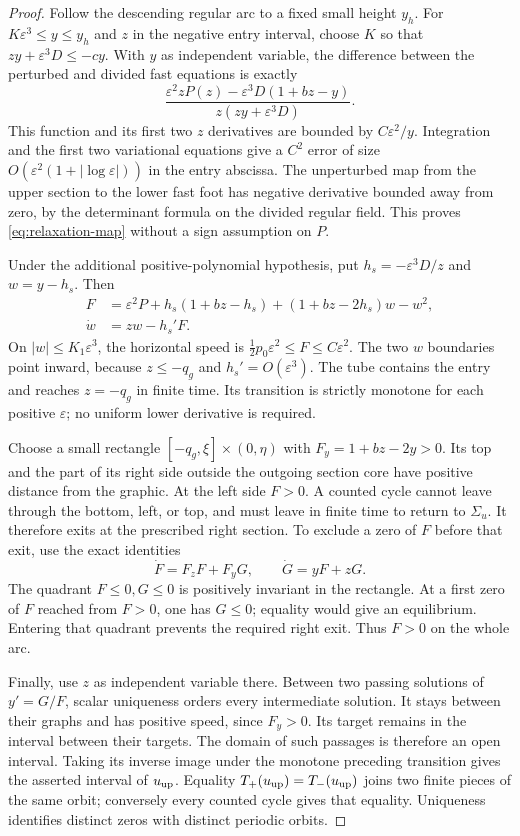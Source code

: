 \begin{proof}
Follow the descending regular arc to a fixed small height $y_h$.
For $K\varepsilon^3\le y\le y_h$ and $z$ in the negative entry
interval, choose $K$ so that $zy+\varepsilon^3D\le-cy$.
With $y$ as independent variable, the difference between the perturbed
and divided fast equations is exactly
\begin{equation}\label{eq:relaxation-error}
 \frac{\varepsilon^2zP(z)
       -\varepsilon^3D(1+bz-y)}{z(zy+\varepsilon^3D)}.
\end{equation}
This function and its first two $z$ derivatives are bounded by
$C\varepsilon^2/y$. Integration and the first two variational
equations give a $C^2$ error of size
$O(\varepsilon^2(1+|\log\varepsilon|))$ in the entry abscissa.
The unperturbed map from the upper section to the lower fast foot
has negative derivative bounded away from zero, by the determinant
formula on the divided regular field. This proves
\eqref{eq:relaxation-map} without a sign assumption on $P$.

Under the additional positive-polynomial hypothesis, put
$h_s=-\varepsilon^3D/z$ and $w=y-h_s$. Then
\begin{align*}
 F&=\varepsilon^2P+h_s(1+bz-h_s)
                  +(1+bz-2h_s)w-w^2,\\
 \dot w&=zw-h_s'F.
\end{align*}
On $|w|\le K_1\varepsilon^3$, the horizontal speed is
$\frac12p_0\varepsilon^2\le F\le C\varepsilon^2$.
The two $w$ boundaries point inward, because $z\le-q_g$ and
$h_s'=O(\varepsilon^3)$. The tube contains the entry and reaches
$z=-q_g$ in finite time. Its transition is strictly monotone for
each positive $\varepsilon$; no uniform lower derivative is required.

Choose a small rectangle $[-q_g,\xi]\times(0,\eta)$ with
$F_y=1+bz-2y>0$. Its top and the part of its right side outside
the outgoing section core have positive distance from the graphic.
At the left side $F>0$. A counted cycle cannot leave through the
bottom, left, or top, and must leave in finite time to return to
$\Sigma_u$. It therefore exits at the prescribed right section.
To exclude a zero of $F$ before that exit, use the exact identities
\[
 \dot F=F_zF+F_yG,\qquad \dot G=yF+zG.
\]
The quadrant $F\le0,G\le0$ is positively invariant in the
rectangle. At a first zero of $F$ reached from $F>0$, one has
$G\le0$; equality would give an equilibrium. Entering that quadrant
prevents the required right exit. Thus $F>0$ on the whole arc.

Finally, use $z$ as independent variable there. Between two passing
solutions of $y'=G/F$, scalar uniqueness orders every intermediate
solution. It stays between their graphs and has positive speed,
since $F_y>0$. Its target remains in the interval between their
targets. The domain of such passages is therefore an open interval.
Taking its inverse image under the monotone preceding transition
gives the asserted interval of $u_{\rm up}$. Equality
$T_+(u_{\rm up})=T_-(u_{\rm up})$ joins
two finite pieces of the same orbit; conversely every counted cycle
gives that equality. Uniqueness identifies distinct zeros with
distinct periodic orbits.
\end{proof}

